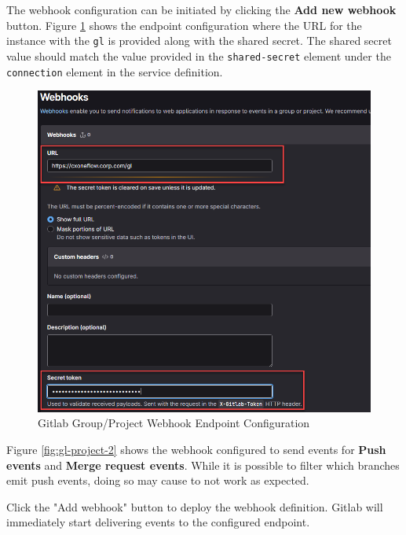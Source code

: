 The webhook configuration can be initiated by clicking the \textbf{Add new webhook} button. Figure \ref{fig:gl-project-1}
shows the endpoint configuration where the URL for the \cxoneflow instance with the \texttt{gl} is provided
along with the shared secret.  The shared secret value should match the value provided in the
\texttt{shared-secret} element under the \texttt{connection} element in the service definition.

\begin{figure}[ht]
  \centering
  \includegraphics[width=\textwidth]{graphics/gl-project-hook-1.png}
  \caption{Gitlab Group/Project Webhook Endpoint Configuration}
  \label{fig:gl-project-1}
\end{figure}

Figure \ref{fig:gl-project-2} shows the webhook configured to send events for 
\textbf{Push events} and \textbf{Merge request events}.  While it is possible to filter
which branches emit push events, doing so may cause \cxoneflow to not work as expected.

Click the "Add webhook" button to deploy the webhook definition.  Gitlab will immediately start delivering
events to the configured \cxoneflow endpoint.


